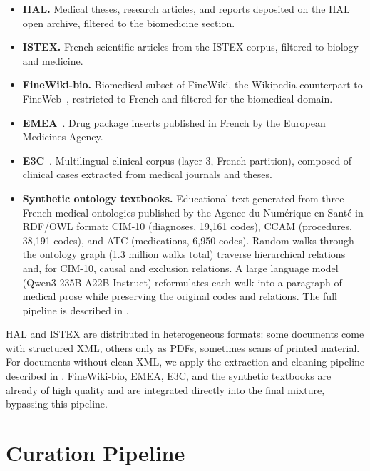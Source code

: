 \begin{itemize}
\item \textbf{HAL.} Medical theses, research articles, and reports deposited on the HAL open archive, filtered to the biomedicine section.
\item \textbf{ISTEX.} French scientific articles from the ISTEX corpus, filtered to biology and medicine.
\item \textbf{FineWiki-bio.} Biomedical subset of FineWiki, the Wikipedia counterpart to FineWeb~\citep{penedo2024fineweb}, restricted to French and filtered for the biomedical domain.
\item \textbf{EMEA}~\citep{neveol14quaero}. Drug package inserts published in French by the European Medicines Agency.
\item \textbf{E3C}~\citep{magnini_e3c_2021}. Multilingual clinical corpus (layer 3, French partition), composed of clinical cases extracted from medical journals and theses.
\item \textbf{Synthetic ontology textbooks.} Educational text generated from three French medical ontologies published by the Agence du Numérique en Santé in RDF/OWL format: CIM-10 (diagnoses, 19{,}161 codes), CCAM (procedures, 38{,}191 codes), and ATC (medications, 6{,}950 codes). Random walks through the ontology graph (1.3 million walks total) traverse hierarchical relations and, for CIM-10, causal and exclusion relations. A large language model (Qwen3-235B-A22B-Instruct) reformulates each walk into a paragraph of medical prose while preserving the original codes and relations. The full pipeline is described in .
\end{itemize}

\begin{reviewread}
HAL and ISTEX are distributed in heterogeneous formats: some documents come with structured XML, others only as PDFs, sometimes scans of printed material. For documents without clean XML, we apply the extraction and cleaning pipeline described in . FineWiki-bio, EMEA, E3C, and the synthetic textbooks are already of high quality and are integrated directly into the final mixture, bypassing this pipeline.
\end{reviewread}


\section{Curation Pipeline}
\label{sec:corpus-pipeline}

